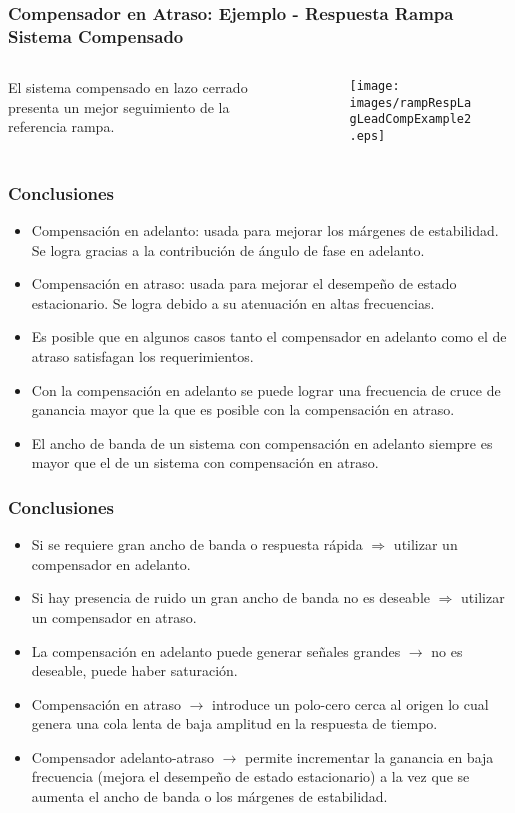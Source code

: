 \documentclass[aspectratio=169, handout]{beamer}
\theoremstyle{definition}
\theoremstyle{plain}
\theoremstyle{remark}
\begin{document}
\begin{frame}[<+->]\frametitle{Compensador en Atraso: Ejemplo - Respuesta Rampa Sistema Compensado}
\vspace*{-2mm}
\begin{columns}
	\begin{column}{0.3\textwidth}
		El sistema compensado en lazo cerrado presenta un mejor seguimiento de la referencia rampa.
	\end{column}
	\begin{column}{0.7\textwidth}
		\begin{figure}
			\centering
			\texttt{[image: images/rampRespLagLeadCompExample2.eps]}
		\end{figure}
	\end{column}
\end{columns}
\end{frame}

\begin{frame}[<+->]\frametitle{Conclusiones}
\begin{itemize}
	\item Compensación en adelanto: usada para mejorar los márgenes de estabilidad. Se logra gracias a la contribución de ángulo de fase en adelanto.
	\item Compensación en atraso: usada para mejorar el desempeño de estado estacionario. Se logra debido a su atenuación en altas frecuencias.
	\item Es posible que en algunos casos tanto el compensador en adelanto como el de atraso satisfagan los requerimientos.
	\item Con la compensación en adelanto se puede lograr una frecuencia de cruce de ganancia mayor que la que es posible con la compensación en atraso.
	\item El ancho de banda de un sistema con compensación en adelanto siempre es mayor que el de un sistema con compensación en atraso.
\end{itemize}
\end{frame}

\begin{frame}[<+->]\frametitle{Conclusiones}
\begin{itemize}
	\item Si se requiere gran ancho de banda o respuesta rápida $\Rightarrow$ utilizar un compensador en adelanto.
	\item Si hay presencia de ruido un gran ancho de banda no es deseable $\Rightarrow$ utilizar un compensador en atraso.
	\item La compensación en adelanto puede generar señales grandes $\rightarrow$ no es deseable, puede haber saturación.
	\item Compensación en atraso $\rightarrow$ introduce un polo-cero cerca al origen lo cual genera una cola lenta de baja amplitud en la respuesta de tiempo.
	\item Compensador adelanto-atraso $\rightarrow$ permite incrementar la ganancia en baja frecuencia (mejora el desempeño de estado estacionario) a la vez que se aumenta el ancho de banda o los márgenes de estabilidad. 
\end{itemize}
\end{frame}
\end{document}
